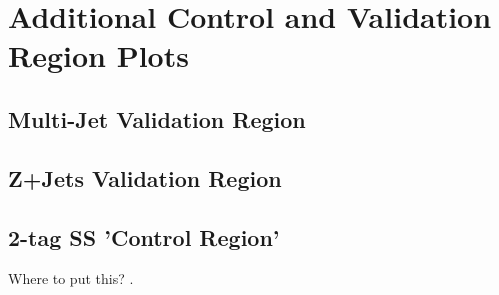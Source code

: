 \clearpage
\section{Additional Control and Validation Region Plots}%
\label{app:control_and_validation_regions}


\subsection{Multi-Jet Validation Region}

\subsection{Z+Jets Validation Region}

\subsection{2-tag SS 'Control Region'}



Where to put
this? \label{sec:app_additional_figures}\label{app:graphical_illustration_copula_model}.

